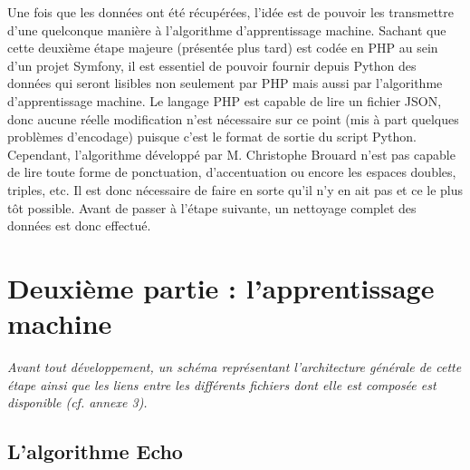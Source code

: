 \documentclass[12pt]{article}
\begin{document}
Une fois que les données ont été récupérées, l'idée est de pouvoir les transmettre d'une quelconque manière à l'algorithme d'apprentissage machine. Sachant que cette deuxième étape majeure (présentée plus tard) est codée en \textsf{PHP} au sein d'un projet \textsf{Symfony}, il est essentiel de pouvoir fournir depuis \textsf{Python} des données qui seront lisibles non seulement par \textsf{PHP} mais aussi par l'algorithme d'apprentissage machine. Le langage \textsf{PHP} est capable de lire un fichier \textsf{JSON},  donc aucune réelle modification n'est nécessaire sur ce point (mis à part quelques problèmes d'encodage) puisque c'est le format de sortie du script \textsf{Python}. Cependant, l'algorithme développé par M. Christophe Brouard n'est pas capable de lire toute forme de ponctuation, d'accentuation ou encore les espaces doubles, triples, etc. Il est donc nécessaire de faire en sorte qu'il n'y en ait pas et ce le plus tôt possible. Avant de passer à l'étape suivante, un nettoyage complet des données est donc effectué.


\newpage
\section{Deuxième partie : l'apprentissage machine}

\textit{Avant tout développement, un schéma représentant l'architecture générale de cette étape ainsi que les liens entre les différents fichiers dont elle est composée est disponible (cf. \textsl{annexe 3}).}

\subsection{L'algorithme Echo}
\end{document}
